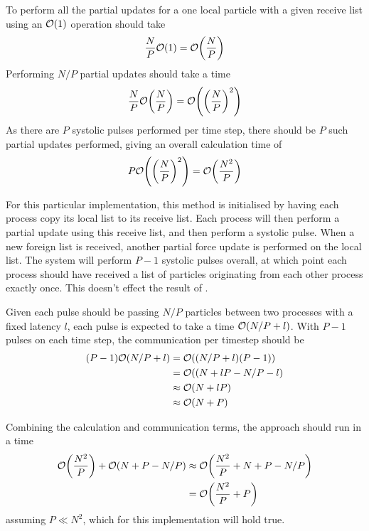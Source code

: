 %
To perform all the partial updates for a one local particle
with a given receive list using an $\mathcal{O}{\left({ 1 }\right)}$ operation should take
\begin{equation}
    \frac{N}{P}\mathcal{O}{\left({ 1 }\right)} = \mathcal{O}{\left({ \frac{N}{P} }\right)}
\end  {equation}
%
Performing $N/P$ partial updates should take a time
\begin{equation}
    \frac{N}{P}\mathcal{O}{\left({ \frac{N}{P} }\right)} = \mathcal{O}{\left({ \left( \frac{N}{P} \right)^2 }\right)}
\end  {equation}
%
As there are $P$ systolic pulses performed per time step,
there should be $P$ such partial updates
performed, giving an overall calculation time of
\begin{equation}
    \label{eqn:systolic_loop_pair_operation_overall_time}
    P\mathcal{O}{\left({  \left(\frac{N}{P}\right)^2  }\right)} = \mathcal{O}{\left({ \frac{N^2}{P} }\right)}
\end  {equation}


For this particular implementation,
this method is initialised by having each process
copy its local list to its receive list.
%
Each process will then perform a partial update using this receive
list, and then perform a systolic pulse.
%
When a new foreign list is received, another partial force update
is performed on the local list.
%
The system will perform $P-1$ systolic pulses overall, at which point
each process should have received a list of particles originating
from each other process exactly once.
%
This doesn't effect the result of
.


%
Given each pulse should be passing $N/P$ particles between two processes
with a fixed latency $l$, each pulse is expected to take a time
$\mathcal{O}{\left({ N/P + l }\right)}$.
%
With $P-1$ pulses on each time step, the communication per timestep should be
\begin{equation}
    \begin{split}
        (P-1)\mathcal{O}{\left({ N/P + l }\right)}
            &= \mathcal{O}{\left({ (N/P + l)(P-1) }\right)} \\
            &= \mathcal{O}{\left({ (N + lP - N/P - l }\right)} \\
            &\approx{} \mathcal{O}{\left({ N + lP }\right)} \\
            &\approx{} \mathcal{O}{\left({ N + P }\right)}
    \end{split}
\end{equation}

%
Combining the calculation and communication terms, the \systolicloop{} approach
should run in a time
\begin{equation}
    \begin{split}
        \mathcal{O}{\left({ \frac{N^2}{P} }\right)} + \mathcal{O}{\left({ N + P - N/P }\right)}
            &\approx{} \mathcal{O}{\left({ \frac{N^2}{P} + N + P - N/P }\right)} \\
            &= \mathcal{O}{\left({ \frac{N^2}{P} + P }\right)}
    \end{split}
\end{equation}
assuming $P \ll{} N^2$, which for this implementation will hold true.


